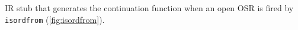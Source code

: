 \label{fig:isordstub} IR stub that generates the continuation function when an open OSR is fired by {\tt isordfrom} (\myfigure\ref{fig:isordfrom}).
